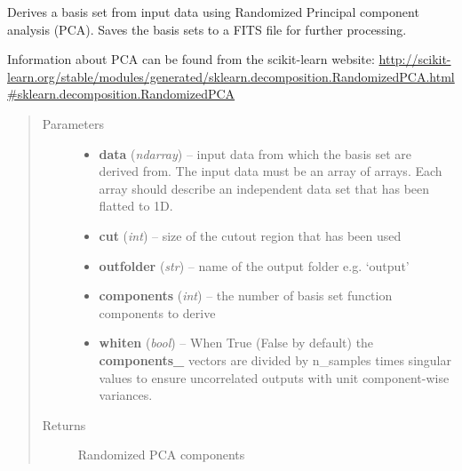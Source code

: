 \documentclass[a4paper,11pt,english]{sphinxmanual}
\begin{document}

\begin{fulllineitems}
\label{analysis:analysis.PSFbasisSets.deriveBasisSetsRandomizedPCA}
Derives a basis set from input data using Randomized Principal component analysis (PCA).
Saves the basis sets to a FITS file for further processing.

Information about PCA can be found from the scikit-learn website:
\href{http://scikit-learn.org/stable/modules/generated/sklearn.decomposition.RandomizedPCA.html\#sklearn.decomposition.RandomizedPCA}{http://scikit-learn.org/stable/modules/generated/sklearn.decomposition.RandomizedPCA.html\#sklearn.decomposition.RandomizedPCA}
\begin{quote}\begin{description}
\item[{Parameters}] \leavevmode\begin{itemize}
\item {} 
\textbf{data} (\emph{ndarray}) -- input data from which the basis set are derived from. The input data must be an array of arrays.
Each array should describe an independent data set that has been flatted to 1D.

\item {} 
\textbf{cut} (\emph{int}) -- size of the cutout region that has been used

\item {} 
\textbf{outfolder} (\emph{str}) -- name of the output folder e.g. `output'

\item {} 
\textbf{components} (\emph{int}) -- the number of basis set function components to derive

\item {} 
\textbf{whiten} (\emph{bool}) -- When True (False by default) the {\color{red}\bfseries{}components\_} vectors are divided by n\_samples times
singular values to ensure uncorrelated outputs with unit component-wise variances.

\end{itemize}

\item[{Returns}] \leavevmode
Randomized PCA components

\end{description}\end{quote}

\end{fulllineitems}
\end{document}

